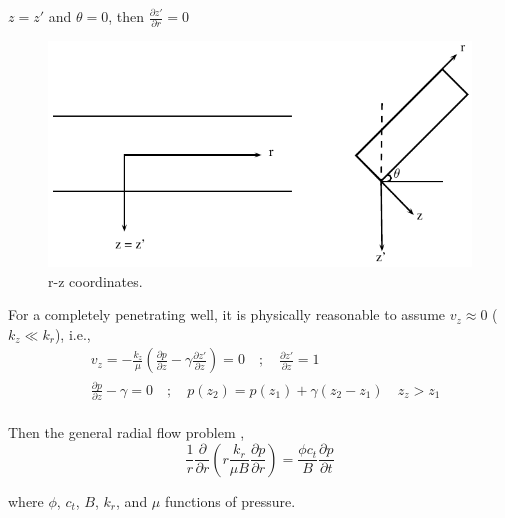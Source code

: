 \documentclass{llncs}
\numberwithin{equation}{section}
\numberwithin{figure}{section}
\numberwithin{table}{section}
\begin{document}
     $z=z'$ and $\theta=0$, then $\frac{\partial z'}{\partial r}=0$
    \begin{figure}
        \begin{center}
        \includegraphics[scale=1]{r_z.pdf}
        \end{center}
        \caption{r-z coordinates.}
        \label{r_z}
    \end{figure}

    For a completely penetrating well, it is physically reasonable to assume $v_{z}\approx0$ ($k_{z}\ll k_{r}$), i.e.,
    \begin{equation}
    \begin{split}
    & {{v}_{z}}=-\frac{{{k}_{z}}}{\mu }\left( \frac{\partial p}{\partial z}-\gamma \frac{\partial z'}{\partial z} \right)=0\quad ;\quad \frac{\partial z'}{\partial z}=1 \\
    & \frac{\partial p}{\partial z}-\gamma =0\quad ;\quad p\left( {{z}_{2}} \right)=p\left( {{z}_{1}} \right)+\gamma \left( {{z}_{2}}-{{z}_{1}} \right)\quad {{z}_{z}}>{{z}_{1}} \\
    \end{split}
    \end{equation}

        Then the general radial flow problem ,
    \begin{equation}
        \frac{1}{r}\frac{\partial }{\partial r}\left( r\frac{{{k}_{r}}}{\mu B}\frac{\partial p}{\partial r} \right)=\frac{\phi {{c}_{t}}}{B}\frac{\partial p}{\partial t}
        \label{Radial_flow_general}
    \end{equation}

    where $\phi$, $c_{t}$, $B$, $k_{r}$, and $\mu$  functions of pressure.
\end{document}
